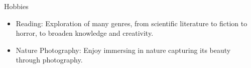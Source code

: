 \documentclass{resume} %
\begin{document}
\begin{workSection}{Hobbies}
    \begin{itemize}
        \vspace{-0.07em}
        \itemsep -6pt {} 
        \item Reading: Exploration of many genres, from scientific literature to fiction to horror, to broaden knowledge and creativity.
        \item Nature Photography: Enjoy immersing in nature capturing its beauty through photography.
     \end{itemize}
\end{workSection}
\end{document}
